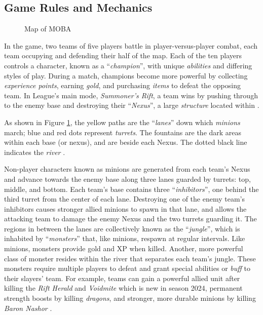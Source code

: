 \documentclass[11pt,a4paper,oneside]{report}
\begin{document}
\subsection{Game Rules and Mechanics}

\begin{figure}[htbp]
  \centering
  
  \caption{Map of MOBA \cite{wikipedia-2024-moba-map}}
  \label{fig:map_of_moba}
\end{figure}

In the game, two teams of five players battle in player-versus-player combat, each team occupying and defending their half of the map. Each of the ten players controls a character, known as a ``\textit{champion}'', with unique \textit{abilities} and differing styles of play. During a match, champions become more powerful by collecting \textit{experience points}, earning \textit{gold}, and purchasing \textit{items} to defeat the opposing team. In League's main mode, \textit{Summoner's Rift}, a team wins by pushing through to the enemy base and destroying their ``\textit{Nexus}'', a large \textit{structure} located within \cite{wikipedia-2024-lol}.

As shown in Figure \ref{fig:map_of_moba}, the yellow paths are the ``\textit{lanes}'' down which \textit{minions} march; blue and red dots represent \textit{turrets}. The fountains are the dark areas within each base (or nexus), and are beside each Nexus. The dotted black line indicates the \textit{river} \cite{wikipedia-2024-lol}.

Non-player characters known as minions are generated from each team's Nexus and advance towards the enemy base along three lanes guarded by turrets: top, middle, and bottom. Each team's base contains three ``\textit{inhibitors}'', one behind the third turret from the center of each lane. Destroying one of the enemy team's inhibitors causes stronger allied minions to spawn in that lane, and allows the attacking team to damage the enemy Nexus and the two turrets guarding it. The regions in between the lanes are collectively known as the ``\textit{jungle}'', which is inhabited by ``\textit{monsters}'' that, like minions, respawn at regular intervals. Like minions, monsters provide gold and XP when killed. Another, more powerful class of monster resides within the river that separates each team's jungle. These monsters require multiple players to defeat and grant special abilities or \textit{buff} to their slayers' team. For example, teams can gain a powerful allied unit after killing the \textit{Rift Herald} and \textit{Voidmite} which is new in season 2024, permanent strength boosts by killing \textit{dragons}, and stronger, more durable minions by killing \textit{Baron Nashor} \cite{wikipedia-2024-lol}.
\end{document}
